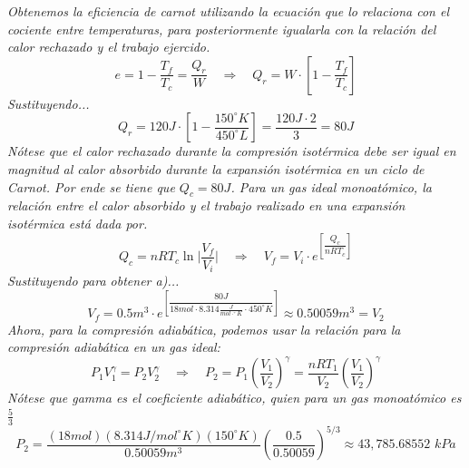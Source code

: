 \documentclass{article}
\newcommand{\cls}{^{\circ}}
\begin{document}
\textit{Obtenemos la eficiencia de carnot utilizando la ecuación que lo relaciona con el cociente entre temperaturas, para posteriormente igualarla con la relación del calor rechazado y el trabajo ejercido.}
\begin{equation}
    e = 1 - \frac{T_f}{T_c} = \frac{Q_r}{W} \quad \Rightarrow \quad Q_r = W \cdot \left[ 1 - \frac{T_f}{T_c} \right]
\end{equation}
\textit{Sustituyendo...}
\begin{equation*}
    Q_r = 120J \cdot \left[ 1 - \frac{150 \cls K}{450 \cls L} \right] =  \frac{120J \cdot 2}{3} = 80J
\end{equation*}
\textit{Nótese que el calor rechazado durante la compresión isotérmica debe ser igual en magnitud al calor absorbido durante la expansión isotérmica en un ciclo de Carnot. Por ende se tiene que $Q_c = 80J$. Para un gas ideal monoatómico, la relación entre el calor absorbido y el trabajo realizado en una expansión isotérmica está dada por.}
\begin{equation}
    Q_c = nRT_c \ln \bigg| \frac{V_f}{V_i} \bigg| \quad \Rightarrow \quad V_f = V_i \cdot e^{ \left[ \dfrac{Q_c}{nRT_c} \right]}
\end{equation}
\textit{Sustituyendo para obtener a)...}
\begin{equation*}
    V_f = 0.5m^3 \cdot e^{\left[ \dfrac{80J}{18 mol \cdot 8.314 \frac{J}{mol \cdot \cls K} \cdot 450 \cls K} \right]} \approx 0.50059 m^3 = V_2
\end{equation*}
\textit{Ahora, para la compresión adiabática, podemos usar la relación para la compresión adiabática en un gas ideal:}
\begin{equation}
    P_1V_1^{\gamma} = P_2V_2^{\gamma} \quad \Rightarrow \quad P_2 = P_1 \left( \frac{V_1}{V_2} \right)^{\gamma} = \frac{nRT_1}{V_2} \left( \frac{V_1}{V_2} \right)^{\gamma} 
\end{equation}
\textit{Nótese que gamma es el coeficiente adiabático, quien para un gas monoatómico es $\frac{5}{3}$}
\begin{equation*}
    P_2 = \frac{(18mol) (8.314 J/mol \cls K)  (150 \cls K)}{0.50059 m^3} \left( \frac{0.5}{0.50059} \right)^{5/3} \approx 43,785.68552 \, \, kPa
\end{equation*}

\\\\
\end{document}
